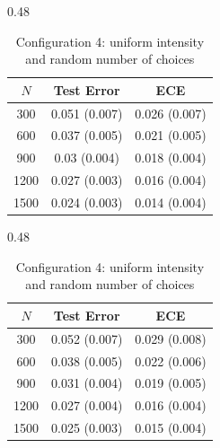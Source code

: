\documentclass[12pt]{amsart}
\theoremstyle{plain}
\theoremstyle{remark}
\numberwithin{equation}{section}
\begin{document}
\begin{table}[htbp]
\begin{subtable}{0.48\textwidth}
\setlength{\tabcolsep}{10pt}
\begin{tabular}{ccc}
\toprule
$N$ & Test Error & ECE \\
\midrule
300  & 0.051 (0.007) & 0.026 (0.007) \\
600  & 0.037 (0.005) & 0.021 (0.005) \\
900  & 0.03 (0.004) & 0.018 (0.004) \\
1200 & 0.027 (0.003) & 0.016 (0.004) \\
1500 & 0.024 (0.003) & 0.014 (0.004) \\
\bottomrule
\end{tabular}
\centering
\caption{\centering Configuration 3: uniform intensity \\ and constant number of choices}
\end{subtable}
\hfill
\begin{subtable}{0.48\textwidth}
\setlength{\tabcolsep}{10pt}
\begin{tabular}{ccc}
\toprule
$N$ & Test Error & ECE \\
\midrule
300  & 0.052 (0.007) & 0.029 (0.008) \\
600  & 0.038 (0.005) & 0.022 (0.006) \\
900  & 0.031 (0.004) & 0.019 (0.005) \\
1200 & 0.027 (0.004) & 0.016 (0.004) \\
1500 & 0.025 (0.003) & 0.015 (0.004) \\
\bottomrule
\end{tabular}
\centering
\caption{\centering Configuration 4: uniform intensity \\ and random number of choices}
\end{subtable}

\vspace{0.4cm}


\end{table}
\end{document}
